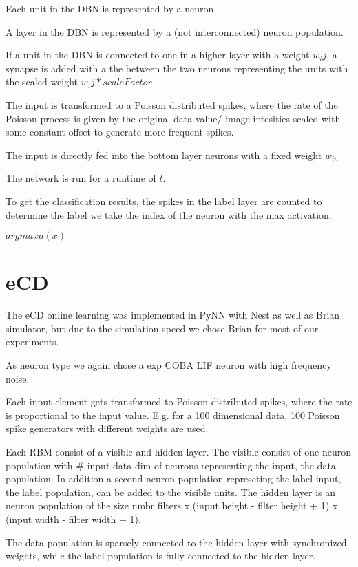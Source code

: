 Each unit in the DBN is represented by a neuron. 

A layer in the DBN is represented by a (not interconnected) neuron population.

If a unit in the DBN is connected to one in a higher layer with a weight $w_ij$, a synapse is added with a the between the two neurons representing the units with the scaled weight $w_ij * scaleFactor$

The input is transformed to a Poisson distributed spikes, where the rate of the Poisson process is given by the original data value/ image intesities scaled with some constant offset to generate more frequent spikes. 
 
The input is directly fed into the bottom layer neurons with a fixed weight $w_{in}$     

The network is run for a runtime of $t$. 

To get the classification results, the spikes in the label layer are counted to determine the label we take the index of the neuron with the max activation:

$argmax a(x)$

\section{eCD}

The eCD online learning was implemented in PyNN with Nest as well as Brian simulator, but due to the  simulation speed we chose Brian for most of our experiments.

As neuron type we again chose a exp COBA LIF neuron with high frequency noise.

Each input element gets transformed to Poisson distributed spikes, where the rate is proportional to the input value. 
E.g. for a 100 dimensional data, 100 Poisson spike generators with different weights are used.

Each RBM consist of a visible and hidden layer. 
The visible consist of one neuron population with \# input data dim of neurons representing the input, the data population. 
In addition a second neuron population represeting the label input, the label population, can be added to the visible units.
The hidden layer is an neuron population of the size  nmbr filters x (input height - filter height + 1) x (input width - filter width + 1).

The data population is sparsely connected to the hidden layer with synchronized weights, while the label population is fully connected to the hidden layer.


